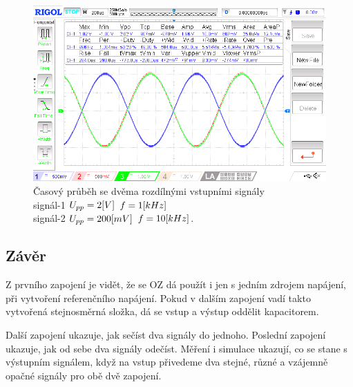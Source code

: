 \documentclass{article}
\begin{document}
\begin{figure}[H]
  \begin{minipage}[t]{\textwidth}
    \centering
    \includegraphics[width=\textwidth]{LAB/NewFile9.png}
    Časový průběh se dvěma rozdílnými vstupními signály \\
    signál-1 \(U_{pp} = 2\-[V]\) \(f = 1\-[kHz]\) \\
    signál-2 \(U_{pp} = 200\-[mV]\) \(f = 10\-[kHz]\).
  \end{minipage}
\end{figure}

\newpage
\subsection{Závěr}

Z prvního zapojení je vidět, že se OZ dá použít i jen s jedním zdrojem napájení, při vytvoření referenčního napájení.
Pokud v dalším zapojení vadí takto vytvořená stejnosměrná složka, dá se vstup a výstup oddělit kapacitorem.

Další zapojení ukazuje, jak sečíst dva signály do jednoho.
Poslední zapojení ukazuje, jak od sebe dva signály odečíst.
Měření i simulace ukazují, co se stane s výstupním signálem, když na vstup přivedeme dva stejné, různé a vzájemně opačné signály pro obě dvě zapojení.
\end{document}
